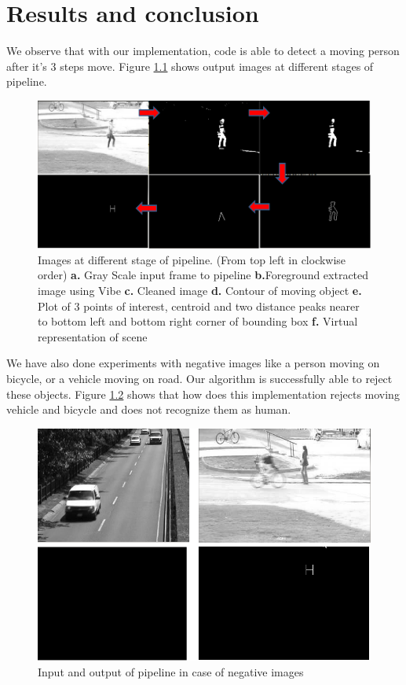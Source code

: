 
\chapter{Results and conclusion} %
\label{Chapter3}

We observe that with our implementation, code is able to detect a moving
person after it's 3 steps move. Figure  \ref{pipeline_images} shows
output images at different stages of pipeline.

\begin{figure}[!b]
\centering
\includegraphics[scale=0.60]{Figures/pipeline_images}
\caption{Images at different stage of pipeline. (From top left in
clockwise order) \textbf{a.} Gray Scale input frame to pipeline
\textbf{b.}Foreground extracted image using Vibe \textbf{c.} Cleaned
image \textbf{d.} Contour of moving object \textbf{e.} Plot of 3 points
of interest, centroid and two distance peaks nearer to bottom left and
bottom right corner of bounding box \textbf{f.} Virtual representation
of scene} 
\label{pipeline_images}
\end{figure}

We have also done experiments with negative images like a person moving
on bicycle, or a vehicle moving on road. Our algorithm is successfully
able to reject these objects. Figure \ref{negative_inputs} shows that
how does this implementation rejects moving vehicle and bicycle and  does
not recognize them as human.
\begin{figure}[!b]
\centering
\includegraphics[scale=0.60]{Figures/negative_inputs}
\caption{Input and output of pipeline in case of negative images}
\label{negative_inputs}
\end{figure}


